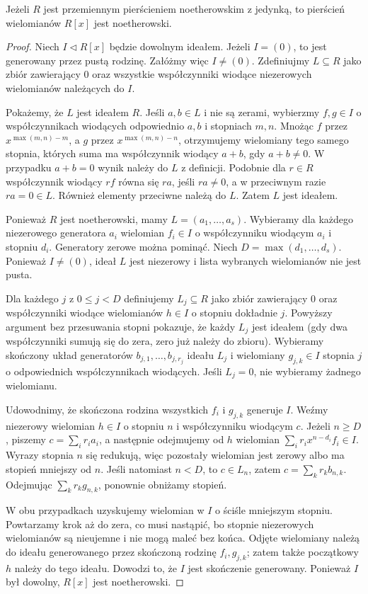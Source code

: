 \begin{twierdzenie}
\label{aa:tw:hilbert-basis}
Jeżeli $R$ jest przemiennym pierścieniem noetherowskim
z jedynką, to pierścień wielomianów $R[x]$ jest
noetherowski.
\end{twierdzenie}
\begin{proof}
Niech $I\triangleleft R[x]$ będzie dowolnym ideałem.
Jeżeli $I=(0)$, to jest generowany przez pustą rodzinę.
Załóżmy więc $I\ne(0)$. Zdefiniujmy $L\subseteq R$
jako zbiór zawierający $0$ oraz wszystkie współczynniki
wiodące niezerowych wielomianów należących do $I$.

Pokażemy, że $L$ jest ideałem $R$. Jeśli $a,b\in L$
i nie są zerami, wybierzmy $f,g\in I$ o współczynnikach
wiodących odpowiednio $a,b$ i stopniach $m,n$.
Mnożąc $f$ przez $x^{\max(m,n)-m}$, a $g$ przez
$x^{\max(m,n)-n}$, otrzymujemy wielomiany
tego samego stopnia, których suma ma
współczynnik wiodący $a+b$, gdy $a+b\ne0$.
W przypadku $a+b=0$ wynik należy do $L$ z definicji.
Podobnie dla $r\in R$ współczynnik wiodący $rf$
równa się $ra$, jeśli $ra\ne0$, a w przeciwnym razie
$ra=0\in L$. Również elementy przeciwne należą do $L$.
Zatem $L$ jest ideałem.

Ponieważ $R$ jest noetherowski, mamy
$L=(a_1,\ldots,a_s)$. Wybieramy dla każdego
niezerowego generatora $a_i$ wielomian $f_i\in I$
o współczynniku wiodącym $a_i$ i stopniu $d_i$.
Generatory zerowe można pominąć. Niech
$D=\max(d_1,\ldots,d_s)$. Ponieważ $I\ne(0)$,
ideał $L$ jest niezerowy i lista wybranych wielomianów
nie jest pusta.

Dla każdego $j$ z $0\le j<D$ definiujemy
$L_j\subseteq R$ jako zbiór zawierający $0$ oraz
współczynniki wiodące wielomianów $h\in I$ o
stopniu dokładnie $j$. Powyższy argument bez
przesuwania stopni pokazuje, że każdy $L_j$ jest
ideałem (gdy dwa współczynniki sumują się do zera,
zero już należy do zbioru). Wybieramy skończony układ
generatorów $b_{j,1},\ldots,b_{j,r_j}$ ideału $L_j$
i wielomiany $g_{j,k}\in I$ stopnia $j$ o odpowiednich
współczynnikach wiodących. Jeśli $L_j=0$, nie wybieramy
żadnego wielomianu.

Udowodnimy, że skończona rodzina wszystkich $f_i$ i
$g_{j,k}$ generuje $I$. Weźmy niezerowy wielomian
$h\in I$ o stopniu $n$ i współczynniku wiodącym $c$.
Jeżeli $n\ge D$, piszemy $c=\sum_i r_i a_i$,
a następnie odejmujemy od $h$ wielomian
$\sum_i r_i x^{n-d_i}f_i\in I$. Wyrazy stopnia $n$
się redukują, więc pozostały wielomian jest zerowy
albo ma stopień mniejszy od $n$.
Jeśli natomiast $n<D$, to $c\in L_n$, zatem
$c=\sum_k r_k b_{n,k}$. Odejmując
$\sum_k r_k g_{n,k}$, ponownie obniżamy stopień.

W obu przypadkach uzyskujemy wielomian w $I$
o ściśle mniejszym stopniu. Powtarzamy krok aż do
zera, co musi nastąpić, bo stopnie niezerowych
wielomianów są nieujemne i nie mogą maleć bez końca.
Odjęte wielomiany należą do ideału generowanego przez
skończoną rodzinę $f_i,g_{j,k}$; zatem także
początkowy $h$ należy do tego ideału. Dowodzi to,
że $I$ jest skończenie generowany. Ponieważ $I$
był dowolny, $R[x]$ jest noetherowski.
\end{proof}

